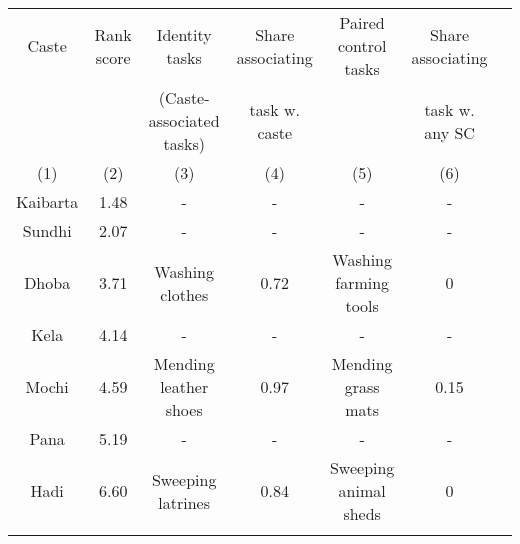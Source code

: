 {\def\sym#1{\ifmmode^{#1}\else\(^{#1}\)\fi}  \begin{tabular}{ccccccc}   \toprule
Caste	&	Rank score  &	Identity tasks 	&	Share associating  &  Paired control tasks	&	Share associating 	 &		\\  
& & (Caste-associated tasks) & task w. caste 	& &	task w. any SC 	\\   
	 (1) & (2) & (3) & (4) & (5) & (6)   \\
\midrule
	
Kaibarta	  & 1.48  &	 -	&	-	&	-	&	-	&		\\     \addlinespace[5pt]
Sundhi	  & 2.07 &	-	&	-	&	-	&	-	&		\\     \addlinespace[5pt]
Dhoba	 & 3.71	 & Washing clothes	&	0.72	& Washing farming tools	&	0	&			 \\     \addlinespace[5pt]
Kela	 & 4.14 &	-	&	-	&	-	&	-	&		\\     \addlinespace[5pt]
Mochi	& 4.59 & Mending leather shoes	&	0.97	& Mending grass mats	&	0.15	&			\\     \addlinespace[5pt]
Pana	 & 5.19	&	-	&	-	&	-	&	-	&	  \\     \addlinespace[5pt]
Hadi	 & 6.60 &	Sweeping latrines	&	0.84	&  Sweeping animal sheds	&	0	&		\\     \addlinespace[5pt]
\bottomrule
\end{tabular}
}
